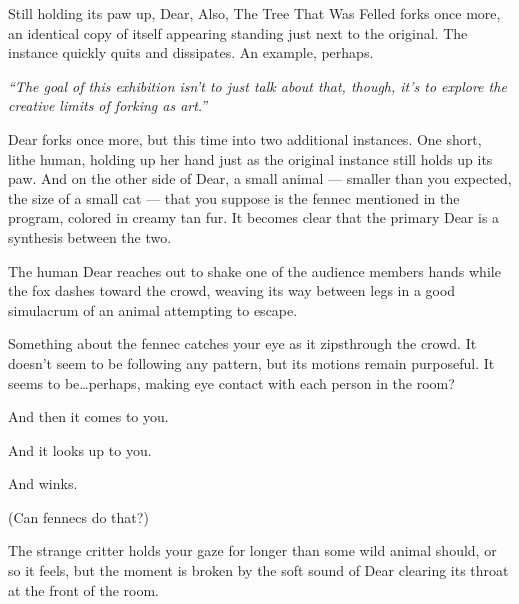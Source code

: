 Still holding its paw up, Dear, Also, The Tree That Was Felled forks once more, an identical copy of itself appearing standing just next to the original. The instance quickly quits and dissipates. An example, perhaps.

\emph{``The goal of this exhibition isn't to just talk about that, though, it's to explore the creative limits of forking as art.''}

Dear forks once more, but this time into two additional instances. One short, lithe human, holding up her hand just as the original instance still holds up its paw. And on the other side of Dear, a small animal --- smaller than you expected, the size of a small cat --- that you suppose is the fennec mentioned in the program, colored in creamy tan fur. It becomes clear that the primary Dear is a synthesis between the two.

The human Dear reaches out to shake one of the audience members hands while the fox dashes toward the crowd, weaving its way between legs in a good simulacrum of an animal attempting to escape.


Something about the fennec catches your eye as it zipsthrough the crowd. It doesn't seem to be following any pattern, but its motions remain purposeful. It seems to be\ldots{}perhaps, making eye contact with each person in the room?

\newpage

\null
\vfill

And then it comes to you.

\null
\vfill

\newpage

\null
\vfill

And it looks up to you.

\null
\vfill

\newpage

\null
\vfill

And winks.

\null
\vfill

\newpage

\null
\vfill

\begin{flushright}
\footnotesize
  (Can fennecs do that?)
\end{flushright}

\newpage

\null
\vfill

The strange critter holds your gaze for longer than some wild animal should, or so it feels, but the moment is broken by the soft sound of Dear clearing its throat at the front of the room.

